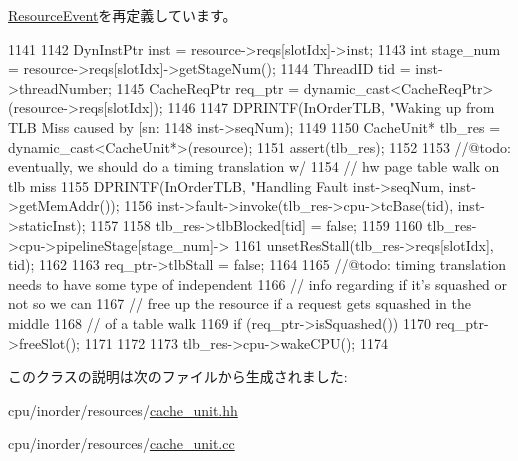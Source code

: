 \hyperlink{classResourceEvent_a2e9c5136d19b1a95fc427e0852deab5c}{ResourceEvent}を再定義しています。


\begin{DoxyCode}
1141 {
1142     DynInstPtr inst = resource->reqs[slotIdx]->inst;
1143     int stage_num = resource->reqs[slotIdx]->getStageNum();
1144     ThreadID tid = inst->threadNumber;
1145     CacheReqPtr req_ptr = dynamic_cast<CacheReqPtr>(resource->reqs[slotIdx]);
1146 
1147     DPRINTF(InOrderTLB, "Waking up from TLB Miss caused by [sn:%
1148             inst->seqNum);
1149 
1150     CacheUnit* tlb_res = dynamic_cast<CacheUnit*>(resource);
1151     assert(tlb_res);
1152 
1153     //@todo: eventually, we should do a timing translation w/
1154     //       hw page table walk on tlb miss
1155     DPRINTF(InOrderTLB, "Handling Fault %
      inst->seqNum, inst->getMemAddr());
1156     inst->fault->invoke(tlb_res->cpu->tcBase(tid), inst->staticInst);
1157 
1158     tlb_res->tlbBlocked[tid] = false;
1159 
1160     tlb_res->cpu->pipelineStage[stage_num]->
1161         unsetResStall(tlb_res->reqs[slotIdx], tid);
1162 
1163     req_ptr->tlbStall = false;
1164 
1165     //@todo: timing translation needs to have some type of independent
1166     //       info regarding if it's squashed or not so we can
1167     //       free up the resource if a request gets squashed in the middle
1168     //       of a table walk
1169     if (req_ptr->isSquashed()) {
1170         req_ptr->freeSlot();
1171     }
1172 
1173     tlb_res->cpu->wakeCPU();
1174 }
\end{DoxyCode}


このクラスの説明は次のファイルから生成されました:\begin{DoxyCompactItemize}
\item 
cpu/inorder/resources/\hyperlink{cache__unit_8hh}{cache\_\-unit.hh}\item 
cpu/inorder/resources/\hyperlink{cache__unit_8cc}{cache\_\-unit.cc}\end{DoxyCompactItemize}
